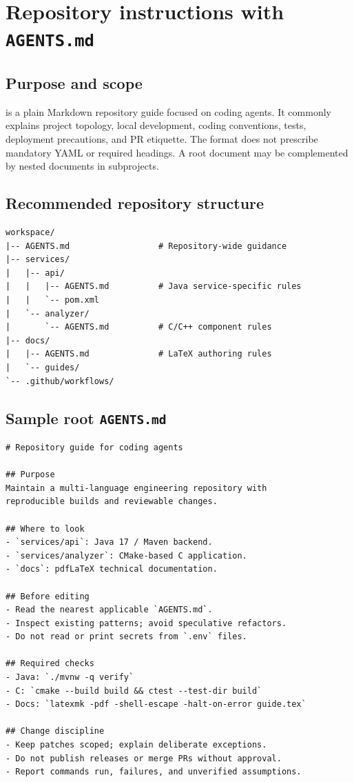 \documentclass[11pt,letterpaper]{article}
\begin{document}
\section{Repository instructions with \texttt{AGENTS.md}}\label{sec:agents}
\subsection{Purpose and scope}
 is a plain Markdown repository guide focused on coding agents. It commonly explains project topology, local development, coding conventions, tests, deployment precautions, and PR etiquette. The format does not prescribe mandatory YAML or required headings. A root document may be complemented by nested documents in subprojects.\cite{agentsmd}

\subsection{Recommended repository structure}
\par\smallskip{}\par
\begin{verbatim}
workspace/
|-- AGENTS.md                  # Repository-wide guidance
|-- services/
|   |-- api/
|   |   |-- AGENTS.md          # Java service-specific rules
|   |   `-- pom.xml
|   `-- analyzer/
|       `-- AGENTS.md          # C/C++ component rules
|-- docs/
|   |-- AGENTS.md              # LaTeX authoring rules
|   `-- guides/
`-- .github/workflows/
\end{verbatim}

\subsection{Sample root \texttt{AGENTS.md}}
\par\smallskip{}\par
\begin{verbatim}
# Repository guide for coding agents

## Purpose
Maintain a multi-language engineering repository with
reproducible builds and reviewable changes.

## Where to look
- `services/api`: Java 17 / Maven backend.
- `services/analyzer`: CMake-based C application.
- `docs`: pdfLaTeX technical documentation.

## Before editing
- Read the nearest applicable `AGENTS.md`.
- Inspect existing patterns; avoid speculative refactors.
- Do not read or print secrets from `.env` files.

## Required checks
- Java: `./mvnw -q verify`
- C: `cmake --build build && ctest --test-dir build`
- Docs: `latexmk -pdf -shell-escape -halt-on-error guide.tex`

## Change discipline
- Keep patches scoped; explain deliberate exceptions.
- Do not publish releases or merge PRs without approval.
- Report commands run, failures, and unverified assumptions.
\end{verbatim}
\end{document}
